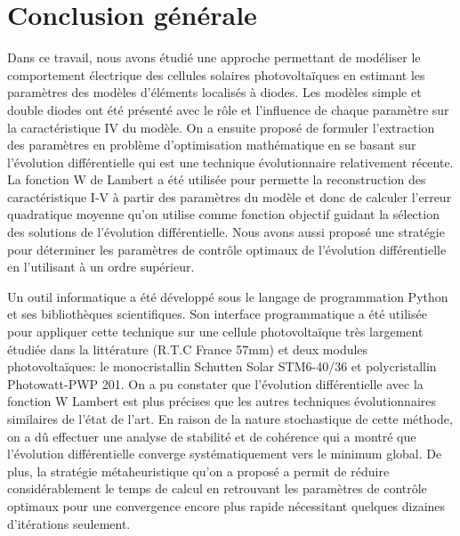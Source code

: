 \chapter*{Conclusion générale}
\label{sec:conc}
Dans ce travail, nous avons étudié une approche permettant de modéliser le comportement électrique des cellules solaires photovoltaïques en estimant les paramètres des modèles d'éléments localisés à diodes. Les modèles simple et double diodes ont été présenté avec le rôle et l'influence de chaque paramètre sur la caractéristique IV du modèle. On a ensuite proposé de formuler l'extraction des paramètres en problème d'optimisation mathématique en se basant sur l'évolution différentielle qui est une technique évolutionnaire relativement récente. La fonction W de Lambert a été utilisée pour permette la reconstruction des caractéristique I-V à partir des paramètres du modèle et donc de calculer l'erreur quadratique moyenne qu'on utilise comme fonction objectif guidant la sélection des solutions de l'évolution différentielle. Nous avons aussi proposé une stratégie pour déterminer les paramètres de contrôle optimaux de l'évolution différentielle en l'utilisant à un ordre supérieur.

Un outil informatique a été développé sous le langage de programmation Python et ses bibliothèques scientifiques. Son interface programmatique a été utilisée pour appliquer cette technique sur une cellule photovoltaïque très largement étudiée dans la littérature (R.T.C France 57mm) et deux modules photovoltaïques: le monocristallin Schutten Solar STM6-40/36 et polycristallin Photowatt-PWP 201. On a pu constater que l'évolution différentielle avec la fonction W Lambert est plus précises que les autres techniques évolutionnaires similaires de l'état de l'art. En raison de la nature stochastique de cette méthode, on a dû effectuer une analyse de stabilité et de cohérence qui a montré que l'évolution différentielle converge systématiquement vers le minimum global. De plus, la stratégie métaheuristique qu'on a proposé a permit de réduire considérablement le temps de calcul en retrouvant les paramètres de contrôle optimaux pour une convergence encore plus rapide nécessitant quelques dizaines d'itérations seulement.

